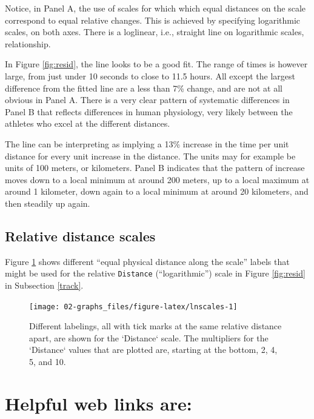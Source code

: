 \documentclass[
  10pt,
  b5paper]{book}
\begin{document}
Notice, in Panel A, the use of scales for which which equal
distances on the scale correspond to equal relative changes.
This is achieved by specifying logarithmic scales, on both
axes. There is a loglinear, i.e., straight line on
logarithmic scales, relationship.

In Figure \ref{fig:resid}, the line looks to be a good fit.
The range of times is however large, from just under 10 seconds
to close to 11.5 hours. All except the largest difference from
the fitted line are a less than 7\% change, and are not at all
obvious in Panel A. There is a very clear pattern of systematic
differences in Panel B that reflects differences in human
physiology, very likely between the athletes who excel at the
different distances.

The line can be interpreting as implying a 13\% increase in the
time per unit distance for every unit increase in the distance.
The units may for example be units of 100 meters, or kilometers.
Panel B indicates that the pattern of increase moves down to a
local minimum at around 200 meters, up to a local maximum at
around 1 kilometer, down again to a local minimum at around 20
kilometers, and then steadily up again.

\hypertarget{relative-distance-scales}{%
\subsection*{Relative distance scales}\label{relative-distance-scales}}

Figure \ref{fig:lnscales} shows different ``equal physical
distance along the scale'' labels that might be used for the
relative \texttt{Distance} (``logarithmic'') scale in Figure
\ref{fig:resid} in Subsection \ref{track}.

\begin{figure}[H]

{\centering \texttt{[image: 02-graphs\_files/figure-latex/lnscales-1]} 

}

\caption{Different labelings, all with tick marks at the same
relative distance apart, are shown for the `Distance` scale.
The multipliers for the `Distance` values that are plotted are,
starting at the bottom, 2, 4, 5, and 10.}\label{fig:lnscales}
\end{figure}

\hypertarget{helpful-web-links-are}{%
\section{Helpful web links are:}\label{helpful-web-links-are}}
\end{document}
